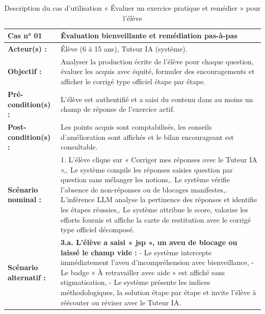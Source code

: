 \documentclass[12pt,a4paper]{report}
\begin{document}
\begin{table}[H]
\centering
\caption{Description du cas d'utilisation « Évaluer un exercice pratique et remédier » pour l'élève}
\label{tab:cu_eval}
\small
\begin{tabular}{|l|p{11cm}|}
\hline
\rowcolor{LightGray}
\textbf{Cas n° 01} & \textbf{Évaluation bienveillante et remédiation pas-à-pas} \\ \hline
\textbf{Acteur(s) :} & Élève (6 à 15 ans), Tuteur IA (système). \\ \hline
\textbf{Objectif :} & Analyser la production écrite de l'élève pour chaque question, évaluer les acquis avec équité, formuler des encouragements et afficher le corrigé type officiel étape par étape. \\ \hline
\textbf{Pré-condition(s) :} & L'élève est authentifié et a saisi du contenu dans au moins un champ de réponse de l'exercice actif. \\ \hline
\textbf{Post-condition(s) :} & Les points acquis sont comptabilisés, les conseils d'amélioration sont affichés et le bilan encourageant est consultable. \\ \hline
\textbf{Scénario nominal :} & 
1. L'élève clique sur « Corriger mes réponses avec le Tuteur IA »,\newline
2. Le système compile les réponses saisies question par question sans mélanger les notions,\newline
3. Le système vérifie l'absence de non-réponses ou de blocages manifestes,\newline
4. L'inférence LLM analyse la pertinence des réponses et identifie les étapes réussies,\newline
5. Le système attribue le score, valorise les efforts fournis et affiche la carte de restitution avec le corrigé type officiel décomposé. \\ \hline
\textbf{Scénario alternatif :} & 
\textbf{3.a. L'élève a saisi « jsp », un aveu de blocage ou laissé le champ vide :}\newline
- Le système intercepte immédiatement l'aveu d'incompréhension avec bienveillance,\newline
- Le badge « À retravailler avec aide » est affiché sans stigmatisation,\newline
- Le système présente les indices méthodologiques, la solution étape par étape et invite l'élève à réécouter ou réviser avec le Tuteur IA. \\ \hline
\end{tabular}
\end{table}
\end{document}
